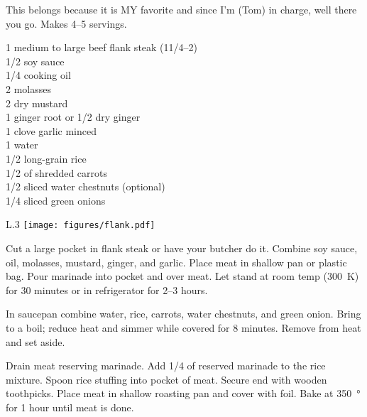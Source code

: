 \begin{open}
  This belongs because it is MY favorite and since I'm (Tom) in charge,
  well there you go.  Makes \numrange{4}{5} servings.
\end{open}
\begin{ingredients}
  1 medium to large beef flank steak (1\SIrange{1/4}{2}{\pound}) \\
  \SI{1/2}{\cup} soy sauce                                    \\
  \SI{1/4}{\cup} cooking oil                                  \\
  \SI{2}{\tblspoon} molasses                                   \\
  \SI{2}{\teaspoon} dry mustard                               \\
  \SI{1}{\teaspoon} ginger root or \SI{1/2}{\teaspoon} dry ginger \\
  1 clove garlic minced                                       \\
  \SI{1}{\cup} water                                          \\
  \SI{1/2}{\cup} long-grain rice                              \\
  \SI{1/2}{\cup} of shredded carrots                          \\
  \SI{1/2}{\cup} sliced water chestnuts (optional)            \\
  \SI{1/4}{\cup} sliced green onions
\end{ingredients}
\begin{wrapfigure}{L}{.3\textwidth}
\centering\texttt{[image: figures/flank.pdf]}
\end{wrapfigure}
Cut a large pocket in flank steak or have your butcher do it.  Combine soy
sauce, oil, molasses, mustard, ginger, and garlic.  Place meat in shallow pan
or plastic bag.  Pour marinade into pocket and over meat. Let stand at room
temp (\SI{300}{\kelvin}) for 30 minutes or in refrigerator for
\numrange{2}{3} hours.

In saucepan combine water, rice, carrots, water chestnuts, and green onion.
Bring to a boil; reduce heat and simmer while covered for 8 minutes.  Remove
from heat and set aside.

Drain meat reserving marinade.  Add \SI{1/4}{\cup} of reserved marinade to the
rice mixture.  Spoon rice stuffing into pocket of meat.  Secure end with
wooden toothpicks.  Place meat in shallow roasting pan and cover with foil.
Bake at \SI{350}{\degree} for 1 hour until meat is done.

